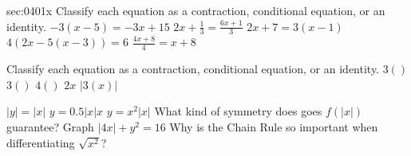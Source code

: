 
\ExSection\label{sec:0401x}
\begin{exercises}{sec:0401x}
\prob[0401ClassA] Classify each equation as a contraction, conditional equation, or an identity.
\subprob $-3(x - 5) = -3x + 15$
\subprob $2x + \frac{1}{3} = \frac{6x + 1}{3}$
\subprob $2x + 7 = 3(x-1)$
\subprob $4(2x - 5(x-3)) = 6$
\subprob $\frac{4x+8}{4} = x + 8$

\prob[0401ClassB] Classify each equation as a contraction, conditional equation, or an identity.
\subprob $3()$
\subprob $3()$
\subprob $4()$
\subprob $2x$
\subprob $|3(x)|$

\prob[0401X] $|y| = |x|$
\prob[0401Para] $y=0.5|x|x$
\prob[0401Cube] $y=x^2|x|$
\prob[0401Sym] What kind of symmetry does goes $f(|x|)$ guarantee?
\prob[0401Football] Graph $|4x| + y^2 = 16$
\prob[0401Chain] Why is the Chain Rule so important when differentiating $\sqrt{x^2}$?


\end{exercises}
